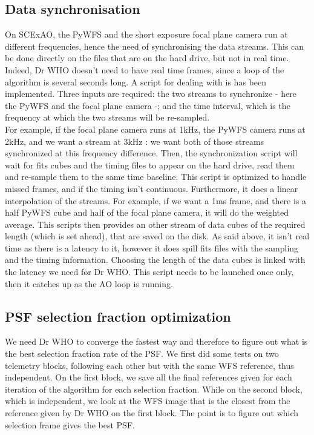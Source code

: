 \documentclass[twocolumn]{aastex62}
\begin{document}
\subsection{Data synchronisation}

On SCExAO, the PyWFS and the short exposure focal plane camera run at different frequencies, hence the need of synchronising the data streams. 
This can be done directly on the files that are on the hard drive, but not in real time. Indeed, Dr WHO doesn't need to have real time frames, since a loop of the algorithm is several seconds long. 
A script for dealing with is has been implemented. Three inputs are required: the two streams to synchronize - here the PyWFS and the focal plane camera -; and the time interval, which is the frequency at which the two streams will be re-sampled. \\
For example, if the focal plane camera runs at 1kHz, the PyWFS camera runs at 2kHz, and we want a stream at 3kHz : we want both of those streams synchronized at this frequency difference. Then, the synchronization script will wait for fits cubes and the timing files to appear on the hard drive, read them and re-sample them to the same time baseline. This script is optimized to handle missed frames, and if the timing isn't continuous. Furthermore, it does a linear interpolation of the streams. For example, if we want a 1ms frame, and there is a half PyWFS cube and half of the focal plane camera, it will do the weighted average. 
This scripts then provides an other stream of data cubes of the required length (which is set ahead), that are saved on the disk. As said above, it isn't real time as there is a latency to it, however it does spill fits files with the sampling and the timing information. Choosing the length of the data cubes is linked with the latency we need for Dr WHO. This script needs to be launched once only, then it catches up as the AO loop is running. 



\subsection{PSF selection fraction optimization}
We need Dr WHO to converge the fastest way and therefore to figure out what is the best selection fraction rate of the PSF. We first did some tests on two telemetry blocks, following each other but with the same WFS reference, thus independent. On the first block, we save all the final references given for each iteration of the algorithm for each selection fraction. While on the second block, which is independent, we look at the WFS image that is the closest from the reference given by Dr WHO on the first block. The point is to figure out which selection frame gives the best PSF. 
\end{document}
